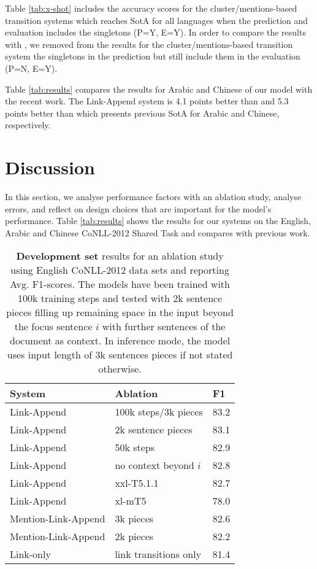 \documentclass[11pt,a4paper]{article}
\newcommand{\LA}{Link-Append}
\newcommand{\M}{Mention-Link-Append}
\newcommand{\LO}{Link-only}
\begin{document}
 Table \ref {tab:x-shot} includes the accuracy scores for the cluster/mentions-based transition systems which reaches SotA for all languages when the prediction and evaluation includes the singletons (P=Y, E=Y). In order to compare the results with , we removed from the results for the cluster/mentions-based transition system the singletons in the prediction but still include them in the evaluation (P=N, E=Y).

Table \ref{tab:results} compares the results for Arabic and Chinese of our model with the recent work. The Link-Append system is 4.1 points better than \cite{min-2021-exploring} and 5.3 points better than \cite{xia-van-durme-2021-moving} which presents previous SotA for Arabic and Chinese, respectively.

 
\section{Discussion}
\label{sec:discussion}

In this section, we analyse performance factors with an ablation study, analyse errors, and reflect on design choices that are important for the model's performance. Table \ref{tab:results} shows the results for our systems on the English, Arabic and Chinese CoNLL-2012 Shared Task and compares with previous work.
\begin{table}[ht]
\centering
\small
\renewcommand{\arraystretch}{1}
\setlength{\tabcolsep}{3.5pt}
\begin{tabular}{l|l|l}
System     & Ablation & F1 \\  \hline
\LA        & 100k steps/3k pieces  &  83.2\\
\LA        & 2k sentence pieces &  83.1\\
\LA        & 50k steps  &  82.9\\
\LA        & no context beyond $i$ &  82.8\\
\LA        & xxl-T5.1.1            &  82.7\\
\LA        & xl-mT5     &  78.0\\ 
\hline
\M        & 3k pieces &   82.6\\ 
\M        & 2k pieces  &  82.2\\ \hline
\LO       & link transitions only  & 81.4 \\ 
\end{tabular}
\caption{{\bf Development set} results for an ablation study using English CoNLL-2012 data sets and reporting Avg. F1-scores. The models have been trained with 100k training steps and tested with 2k sentence pieces filling up remaining space in the input beyond the focus sentence $i$ with further sentences of the document as context. In inference mode, the model uses input length of 3k sentences pieces if not stated otherwise.
\label{tab:ablation}
}
\end{table}
\end{document}
